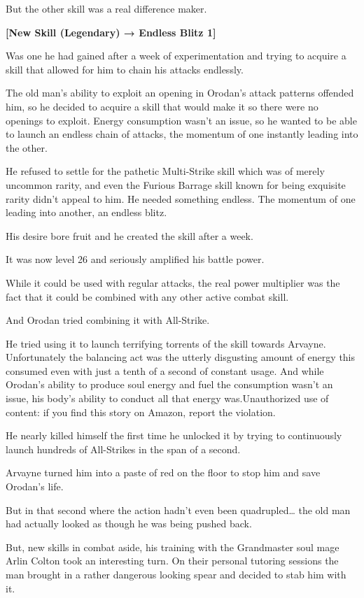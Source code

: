 \documentclass[a4paper,10pt]{book}
\begin{document}
But the other skill was a real difference maker.\par
\textbf{[New Skill (Legendary) → Endless Blitz 1]}\par
Was one he had gained after a week of experimentation and trying to acquire a skill that allowed for him to chain his attacks endlessly.\par
The old man’s ability to exploit an opening in Orodan’s attack patterns offended him, so he decided to acquire a skill that would make it so there were no openings to exploit. Energy consumption wasn’t an issue, so he wanted to be able to launch an endless chain of attacks, the momentum of one instantly leading into the other.\par
He refused to settle for the pathetic Multi-Strike skill which was of merely uncommon rarity, and even the Furious Barrage skill known for being exquisite rarity didn’t appeal to him. He needed something endless. The momentum of one leading into another, an endless blitz.\par
His desire bore fruit and he created the skill after a week.\par
It was now level 26 and seriously amplified his battle power.\par
While it could be used with regular attacks, the real power multiplier was the fact that it could be combined with any other active combat skill.\par
And Orodan tried combining it with All-Strike.\par
He tried using it to launch terrifying torrents of the skill towards Arvayne. Unfortunately the balancing act was the utterly disgusting amount of energy this consumed even with just a tenth of a second of constant usage. And while Orodan’s ability to produce soul energy and fuel the consumption wasn’t an issue, his body’s ability to conduct all that energy was.Unauthorized use of content: if you find this story on Amazon, report the violation.\par
He nearly killed himself the first time he unlocked it by trying to continuously launch hundreds of All-Strikes in the span of a second.\par
Arvayne turned him into a paste of red on the floor to stop him and save Orodan's life.\par
But in that second where the action hadn’t even been quadrupled… the old man had actually looked as though he was being pushed back.\par
But, new skills in combat aside, his training with the Grandmaster soul mage Arlin Colton took an interesting turn. On their personal tutoring sessions the man brought in a rather dangerous looking spear and decided to stab him with it.\par
\end{document}
